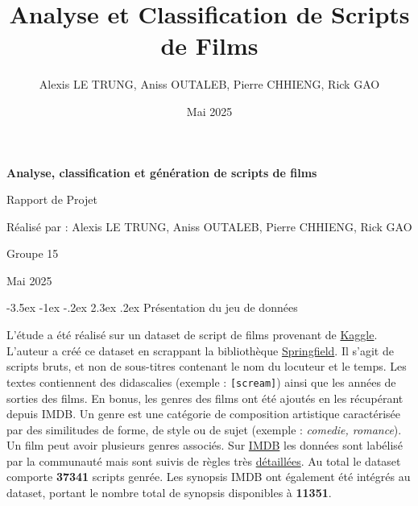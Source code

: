 \documentclass[12pt]{report}
\title{Analyse et Classification de Scripts de Films}
\author{Alexis LE TRUNG, Aniss OUTALEB, Pierre CHHIENG, Rick GAO}
\date{Mai 2025}
\makeatletter
\renewcommand{\chapter}{\@startsection{chapter}{0}{\z@}
  {-3.5ex \@plus -1ex \@minus -.2ex}
  {2.3ex \@plus.2ex}
  {\normalfont\LARGE\bfseries}}
\makeatother
\begin{document}
\begin{titlepage}
    \begin{center}
        \vspace*{\fill}

        {\Huge\bfseries Analyse, classification et génération de scripts de films \par}

        \vspace{2cm}

        {\Large Rapport de Projet \par}

        \vspace{1.5cm}

        {\large Réalisé par : Alexis LE TRUNG, Aniss OUTALEB, Pierre CHHIENG, Rick GAO \par}
        {\large Groupe 15\par}

        \vspace*{\fill}

        {\large Mai 2025 \par}
    \end{center}
\end{titlepage}



\tableofcontents
\newpage

\chapter{Présentation du jeu de données}

L'étude a été réalisé sur un dataset de script de films provenant de \href{https://www.kaggle.com/datasets/bwandowando/40k-movie-scripts-from-springfield-springfield}{Kaggle}. L’auteur a créé ce dataset en scrappant la bibliothèque \href{https://www.springfieldspringfield.co.uk/}{Springfield}. Il s'agit de scripts bruts, et non de sous-titres contenant le nom du locuteur et le temps. Les textes contiennent des didascalies (exemple :  \texttt{[scream]}) ainsi que les années de sorties des films. En bonus, les genres des films ont été ajoutés en les récupérant depuis IMDB. Un genre est une catégorie de composition artistique caractérisée par des similitudes de forme, de style ou de sujet (exemple : \textit{comedie, romance}). Un film peut avoir plusieurs genres associés. Sur \href{https://www.imdb.com/fr/}{IMDB} les données sont labélisé par la communauté mais sont suivis de règles très \href{https://help.imdb.com/article/contribution/titles/genres/GZDRMS6R742JRGAG#}{détaillées}. Au total le dataset comporte \textbf{37341} scripts genrée. Les synopsis IMDB ont également été intégrés au dataset, portant le nombre total de synopsis disponibles à \textbf{11351}.
\end{document}
